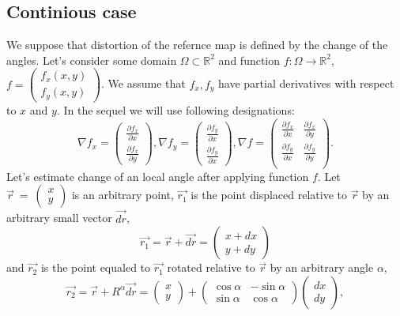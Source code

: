 \documentclass{article}
\newcommand{\vect}{\overrightarrow}
\begin{document}
\subsection{Continious case}
\label{sec:continious}
We suppose that distortion of the refernce map is defined by the change of the angles. Let's consider some domain $\Omega \subset \mathbb{R}^2$ and function $f: \Omega \to \mathbb{R}^2$, 
$f = \begin{pmatrix} f_x(x, y) \\ f_y(x, y) \end{pmatrix}$. We assume that $f_x, f_y$ have partial derivatives with respect to $x$ and $y$. In the sequel we will use following designations:
$$
  \nabla f_x = \begin{pmatrix} \frac{\partial f_x}{\partial x} \\ \frac{\partial f_x}{\partial y} \end{pmatrix}, 
  \nabla f_y = \begin{pmatrix} \frac{\partial f_y}{\partial x} \\ \frac{\partial f_y}{\partial x} \end{pmatrix}, 
  \nabla f = \begin{pmatrix} 
    \frac{\partial f_x}{\partial x} & \frac{\partial f_x}{\partial y} \\
    \frac{\partial f_y}{\partial x} & \frac{\partial f_y}{\partial y} \\
  \end{pmatrix}. 
$$
Let's estimate change of an local angle after applying function $f$. Let $\vect{r}~=~\begin{pmatrix} x \\ y \end{pmatrix}$ is an arbitrary point, $\vect{r_1}$ is the point displaced relative to $\vect{r}$ by an arbitrary 
small vector $\vect{dr}$, 
$$\vect{r_1} = \vect{r} + \vect{dr} = \begin{pmatrix} x + dx \\ y + dy \end{pmatrix}$$
and $\vec{r_2}$ is the point equaled to $\vec{r_1}$ rotated relative to $\vec{r}$ by an arbitrary angle $\alpha$,
$$\vect{r_2} = \vect{r} + R^\alpha \vect{dr} = \begin{pmatrix} x \\ y \end{pmatrix} + \begin{pmatrix} \cos \alpha & -\sin \alpha \\ \sin \alpha & \cos \alpha \end{pmatrix} \begin{pmatrix} dx \\ dy \end{pmatrix},$$
\end{document}
